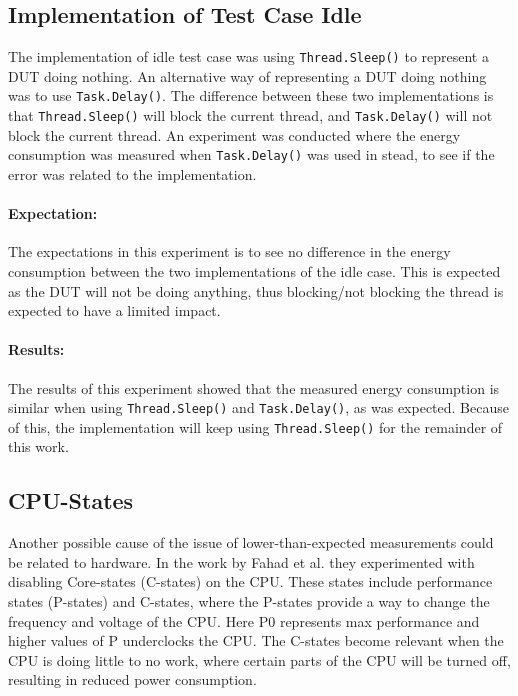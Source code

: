 \subsection{Implementation of Test Case Idle}

The implementation of idle test case was using \texttt{Thread.Sleep()} to represent a DUT doing nothing. An alternative way of representing a DUT doing nothing was to use \texttt{Task.Delay()}. The difference between these two implementations is that \texttt{Thread.Sleep()} will block the current thread, and \texttt{Task.Delay()} will not block the current thread. An experiment was conducted where the energy consumption was measured when \texttt{Task.Delay()} was used in stead, to see if the error was related to the implementation.

\paragraph*{Expectation:} The expectations in this experiment is to see no difference in the energy consumption between the two implementations of the idle case. This is expected as the DUT will not be doing anything, thus blocking/not blocking the thread is expected to have a limited impact.

\paragraph*{Results:} The results of this experiment showed that the measured energy consumption is similar when using \texttt{Thread.Sleep()} and \texttt{Task.Delay()}, as was expected. Because of this, the implementation will keep using \texttt{Thread.Sleep()} for the remainder of this work.

\subsection*{CPU-States}

Another possible cause of the issue of lower-than-expected measurements could be related to hardware. In the work by Fahad et al.\cite[]{fahad2019comparative} they experimented with disabling Core-states (C-states) on the CPU. These states include performance states (P-states) and C-states\cite[]{PCStat}, where the P-states provide a way to change the frequency and voltage of the CPU. Here P0 represents max performance and higher values of P underclocks the CPU. The C-states become relevant when the CPU is doing little to no work, where certain parts of the CPU will be turned off, resulting in reduced power consumption. 

